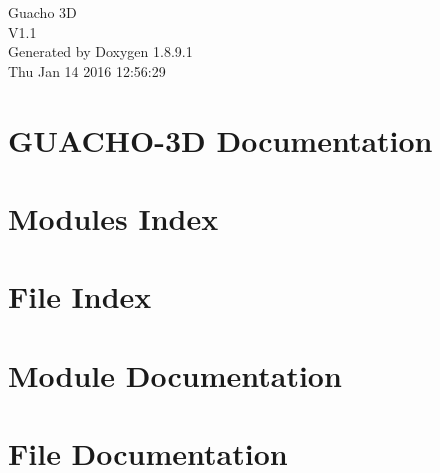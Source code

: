 \documentclass[twoside]{book}
\newcommand{\+}{\discretionary{\mbox{\scriptsize$\hookleftarrow$}}{}{}}
\newcommand{\clearemptydoublepage}{%
  \newpage{\pagestyle{empty}\cleardoublepage}%
}
\begin{document}
\hypersetup{pageanchor=false,
             bookmarks=true,
             bookmarksnumbered=true,
             pdfencoding=unicode
            }
\begin{titlepage}
\vspace*{7cm}
\begin{center}%
{\Large Guacho 3\+D \\[1ex]\large V1.\+1 }\\
\vspace*{1cm}
{\large Generated by Doxygen 1.8.9.1}\\
\vspace*{0.5cm}
{\small Thu Jan 14 2016 12:56:29}\\
\end{center}
\end{titlepage}
\clearemptydoublepage
\tableofcontents
\clearemptydoublepage
{}
\hypersetup{pageanchor=true}

\chapter{G\+U\+A\+C\+H\+O-\/3\+D Documentation}
\label{index}\hypertarget{index}{}
\chapter{Modules Index}

\chapter{File Index}

\chapter{Module Documentation}























\chapter{File Documentation}


























\backmatter
\newpage
{}
\clearemptydoublepage
{}
\printindex
\end{document}
